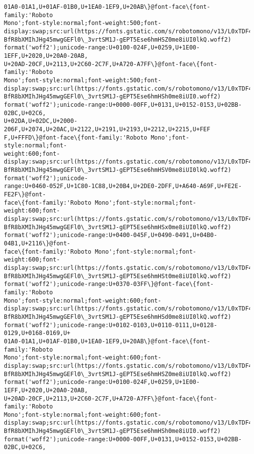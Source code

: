 \documentclass[11pt]{article}
\begin{document}
\begin{Verbatim}[commandchars=\\\{\}]
01A0-01A1,U+01AF-01B0,U+1EA0-1EF9,U+20AB\}@font-face\{font-family:'Roboto
Mono';font-style:normal;font-weight:500;font-
display:swap;src:url(https://fonts.gstatic.com/s/robotomono/v13/L0xTDF4xlVMF-
BfR8bXMIhJHg45mwgGEFl0\_3vrtSM1J-gEPT5Ese6hmHSZ0me8iUI0lkQ.woff2)
format('woff2');unicode-range:U+0100-024F,U+0259,U+1E00-1EFF,U+2020,U+20A0-20AB,
U+20AD-20CF,U+2113,U+2C60-2C7F,U+A720-A7FF\}@font-face\{font-family:'Roboto
Mono';font-style:normal;font-weight:500;font-
display:swap;src:url(https://fonts.gstatic.com/s/robotomono/v13/L0xTDF4xlVMF-
BfR8bXMIhJHg45mwgGEFl0\_3vrtSM1J-gEPT5Ese6hmHSh0me8iUI0.woff2)
format('woff2');unicode-range:U+0000-00FF,U+0131,U+0152-0153,U+02BB-02BC,U+02C6,
U+02DA,U+02DC,U+2000-206F,U+2074,U+20AC,U+2122,U+2191,U+2193,U+2212,U+2215,U+FEF
F,U+FFFD\}@font-face\{font-family:'Roboto Mono';font-style:normal;font-
weight:600;font-
display:swap;src:url(https://fonts.gstatic.com/s/robotomono/v13/L0xTDF4xlVMF-
BfR8bXMIhJHg45mwgGEFl0\_3vrtSM1J-gEPT5Ese6hmHSV0me8iUI0lkQ.woff2)
format('woff2');unicode-
range:U+0460-052F,U+1C80-1C88,U+20B4,U+2DE0-2DFF,U+A640-A69F,U+FE2E-FE2F\}@font-
face\{font-family:'Roboto Mono';font-style:normal;font-weight:600;font-
display:swap;src:url(https://fonts.gstatic.com/s/robotomono/v13/L0xTDF4xlVMF-
BfR8bXMIhJHg45mwgGEFl0\_3vrtSM1J-gEPT5Ese6hmHSx0me8iUI0lkQ.woff2)
format('woff2');unicode-range:U+0400-045F,U+0490-0491,U+04B0-04B1,U+2116\}@font-
face\{font-family:'Roboto Mono';font-style:normal;font-weight:600;font-
display:swap;src:url(https://fonts.gstatic.com/s/robotomono/v13/L0xTDF4xlVMF-
BfR8bXMIhJHg45mwgGEFl0\_3vrtSM1J-gEPT5Ese6hmHSt0me8iUI0lkQ.woff2)
format('woff2');unicode-range:U+0370-03FF\}@font-face\{font-family:'Roboto
Mono';font-style:normal;font-weight:600;font-
display:swap;src:url(https://fonts.gstatic.com/s/robotomono/v13/L0xTDF4xlVMF-
BfR8bXMIhJHg45mwgGEFl0\_3vrtSM1J-gEPT5Ese6hmHSd0me8iUI0lkQ.woff2)
format('woff2');unicode-range:U+0102-0103,U+0110-0111,U+0128-0129,U+0168-0169,U+
01A0-01A1,U+01AF-01B0,U+1EA0-1EF9,U+20AB\}@font-face\{font-family:'Roboto
Mono';font-style:normal;font-weight:600;font-
display:swap;src:url(https://fonts.gstatic.com/s/robotomono/v13/L0xTDF4xlVMF-
BfR8bXMIhJHg45mwgGEFl0\_3vrtSM1J-gEPT5Ese6hmHSZ0me8iUI0lkQ.woff2)
format('woff2');unicode-range:U+0100-024F,U+0259,U+1E00-1EFF,U+2020,U+20A0-20AB,
U+20AD-20CF,U+2113,U+2C60-2C7F,U+A720-A7FF\}@font-face\{font-family:'Roboto
Mono';font-style:normal;font-weight:600;font-
display:swap;src:url(https://fonts.gstatic.com/s/robotomono/v13/L0xTDF4xlVMF-
BfR8bXMIhJHg45mwgGEFl0\_3vrtSM1J-gEPT5Ese6hmHSh0me8iUI0.woff2)
format('woff2');unicode-range:U+0000-00FF,U+0131,U+0152-0153,U+02BB-02BC,U+02C6,

\end{Verbatim}
\end{document}
